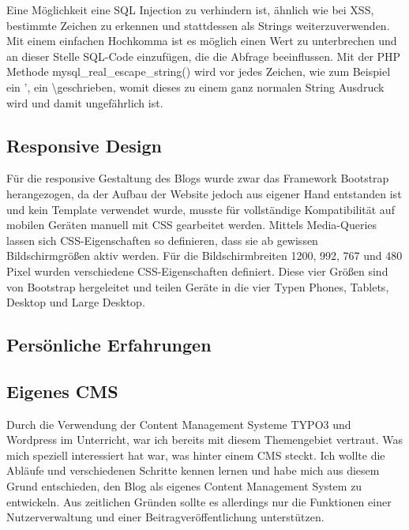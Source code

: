 {      Eine Möglichkeit eine SQL Injection zu verhindern ist, ähnlich wie bei XSS, bestimmte Zeichen zu erkennen und stattdessen als Strings weiterzuverwenden.
      Mit einem einfachen Hochkomma ist es möglich einen Wert zu unterbrechen und an dieser Stelle SQL-Code einzufügen, die die Abfrage beeinflussen.
      Mit der PHP Methode mysql\_real\_escape\_string() wird vor jedes Zeichen, wie zum Beispiel ein ', ein \textbackslash geschrieben, womit dieses zu einem ganz normalen
      String Ausdruck wird und damit ungefährlich ist.

    \subsection*{Responsive Design}
    Für die responsive Gestaltung des Blogs wurde zwar das Framework Bootstrap herangezogen, da der Aufbau der Website jedoch aus eigener Hand
    entstanden ist und kein Template verwendet wurde, musste für vollständige Kompatibilität auf mobilen Geräten manuell mit CSS gearbeitet werden.
    Mittels Media-Queries lassen sich CSS-Eigenschaften so definieren, dass sie ab gewissen Bildschirmgrößen aktiv werden. Für die Bildschirmbreiten 1200, 992, 767 und 480
    Pixel wurden verschiedene CSS-Eigenschaften definiert. Diese vier Größen sind von Bootstrap hergeleitet und teilen Geräte in die vier Typen Phones, Tablets,
    Desktop und Large Desktop.

  \subsection{Persönliche Erfahrungen}
    \subsection*{Eigenes CMS}
    Durch die Verwendung der Content Management Systeme TYPO3 und Wordpress im Unterricht, war ich bereits mit diesem Themengebiet vertraut. Was mich speziell interessiert hat war,
    was hinter einem CMS steckt. Ich wollte die Abläufe und verschiedenen Schritte kennen lernen und habe mich aus diesem Grund entschieden, den Blog als eigenes Content Management System
    zu entwickeln. Aus zeitlichen Gründen sollte es allerdings nur die Funktionen einer Nutzerverwaltung und einer Beitragveröffentlichung unterstützen.

}
